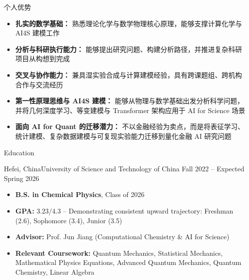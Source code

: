 \documentclass[]{mcdowellcv}
\begin{document}
\begin{cvsection}{个人优势}
	\begin{cvsubsection}{}{}{}
		\begin{itemize}
			\item \textbf{扎实的数学基础：} 熟悉理论化学与数学物理核心原理，能够支撑计算化学与 AI4S 建模工作
			\item \textbf{分析与科研执行能力：} 能够提出研究问题、构建分析路径，并推进复杂科研项目从构想到完成
			\item \textbf{交叉与协作能力：} 兼具湿实验合成与计算建模经验，具有跨课题组、跨机构合作与交流经历
			\item \textbf{第一性原理思维与 AI4S 建模：} 能够从物理与数学基础出发分析科学问题，并将几何深度学习、等变建模与 Transformer 架构应用于 AI for Science 场景
			\item \textbf{面向 AI for Quant 的迁移潜力：} 不以金融经验为卖点，而是将表征学习、统计建模、复杂数据建模与可复现实验能力迁移到量化金融 AI 研究问题
		\end{itemize}
	\end{cvsubsection}
\end{cvsection}

\newpage

\address{University of Science and Technology of China \linebreak Department of Chemical Physics, Class of 2026}

\makeheader

\begin{cvsection}{Education}
	\begin{cvsubsection}{Hefei, China}{University of Science and Technology of China }{Fall 2022 -- Expected Spring 2026}
		\begin{itemize}
			\item \textbf{B.S. in Chemical Physics}, Class of 2026
			\item \textbf{GPA:} 3.23/4.3 -- Demonstrating consistent upward trajectory: Freshman (2.6), Sophomore (3.4), Junior (3.5)
			\item \textbf{Advisor:} Prof. Jun Jiang (Computational Chemistry \& AI for Science)
			\item \textbf{Relevant Coursework:} Quantum Mechanics, Statistical Mechanics, Mathematical Physics Equations, Advanced Quantum Mechanics, Quantum Chemistry, Linear Algebra
		\end{itemize}
	\end{cvsubsection}
\end{cvsection}
\end{document}
